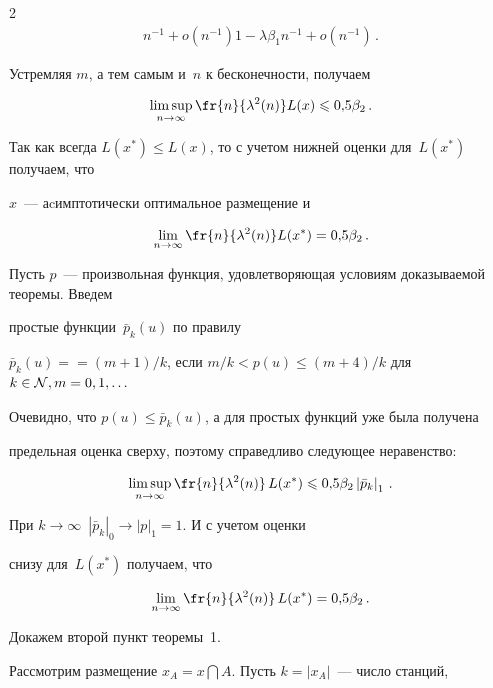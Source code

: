 \begin{multicols}{2}
\begin{multline*}
{n^{-1}+o(n^{-1})}{1-\lambda \beta_1 n^{-1}+o(n^{-1})}\,.


\end{multline*}


Устремляя $m$, а тем самым и~$n$ к бесконечности, получаем


$$


\lims{n \to \infty}\fr{n}{\lambda^2(n)}L(x)\leqslant 0{,}5\beta_2\,.


$$


Так как всегда $L(x^*)\leqslant L(x)$, то с учетом нижней оценки для~$L(x^*)$ получаем, что


$x$~--- аcимптотически оптимальное размещение и


$$


\liml{n \to \infty}\fr{n}{\lambda^2(n)}L(x^*) = 0{,}5\beta_2\,.


$$


Пусть $p$~--- произвольная функция, удовле\-тво\-ря\-ющая условиям доказываемой теоремы. Введем


прос\-тые функции~$\bar{p}_k(u)$ по правилу


$\bar{p}_k(u)=$\linebreak $=(m+1)/k$, если $m/k<p(u)\leqslant (m+4)/k$ для $k\in {\cal N}, m=0,1,\ldots$





Очевидно, что $p(u)\leqslant \bar{p}_{k}(u)$, а для простых функций уже была получена


предельная оценка сверху, поэтому справедливо следующее неравенство:


$$


\lims{n \to \infty}\fr{n}{\lambda^2(n)}\,L(x^*)\leqslant 0{,}5\beta_2 \left|\bar{p}_k \right|_1\,.


$$


При $k \to \infty$\ $\left|\bar{p}_k \right|_0 \to \left|p\right|_1=1$. И с учетом оценки


снизу для~$L(x^*)$ получаем, что


$$


\liml{n \to \infty}\fr{n}{\lambda^2(n)}\,L(x^*) = 0{,}5\beta_2\,.


$$


Докажем второй пункт теоремы~1.


\pagebreak





Рассмотрим размещение $x_A=x\bigcap A$. Пусть $k=\left|x_A\right|$~--- число станций,



\end{multicols}
